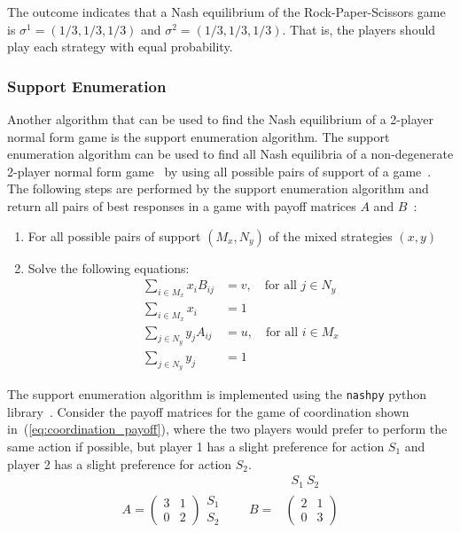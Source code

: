 The outcome indicates that a Nash equilibrium of the Rock-Paper-Scissors game
is \(\sigma^1 = (1/3, 1/3, 1/3)\) and \(\sigma^2 = (1/3, 1/3, 1/3)\).
That is, the players should play each strategy with equal probability.


\subsubsection{Support Enumeration}

Another algorithm that can be used to find the Nash equilibrium of a 2-player
normal form game is the support enumeration algorithm.
The support enumeration algorithm can be used to find all Nash equilibria of a
non-degenerate 2-player normal form game~\cite{degenerategames} by using all
possible pairs of support of a game~\cite{myerson1997game}.
The following steps are performed by the support enumeration algorithm and
return all pairs of best responses in a game with payoff matrices \(A\) and
\(B\)~\cite{supportenumeration}:

\begin{enumerate}
    \item For all possible pairs of support \((M_x, N_y)\) of the mixed
    strategies \((x, y)\)
    \item Solve the following equations:
    \begin{align}
        \sum_{i \in M_x} x_i B_{ij} &= v, \quad \text{for all } j \in N_y \\
        \sum_{i \in M_x} x_i &= 1 \\
        \sum_{j \in N_y} y_j A_{ij} &= u, \quad \text{for all } i \in M_x \\
        \sum_{j \in N_y} y_j &= 1
    \end{align}
\end{enumerate}

The support enumeration algorithm is implemented using the
\lstinline[style=pystyle]{nashpy} python library~\cite{thenashpyproject}.
Consider the payoff matrices for the game of coordination shown
in~(\ref{eq:coordination_payoff}), where the two players would prefer to
perform the same action if possible, but player 1 has a slight preference
for action \(S_1\) and player 2 has a slight preference for action \(S_2\).
\begin{align}
    & \ \; S_1 \ S_2 \nonumber \\
    A =
    \begin{pmatrix}
        3 & 1 \\
        0 & 2
    \end{pmatrix}
    \begin{matrix}
        S_1 \\
        S_2
    \end{matrix} \qquad
    B = &
    \begin{pmatrix}
        2 & 1 \\
        0 & 3
    \end{pmatrix}
    \label{eq:coordination_payoff}
\end{align}

